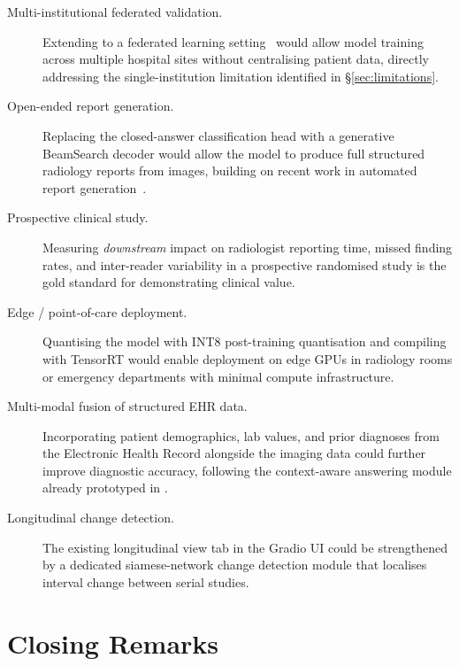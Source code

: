 \begin{description}
  \item[Multi-institutional federated validation.]
        Extending \medxplain{} to a federated learning setting~\citep{mcmahan2017federated}
        would allow model training across multiple hospital sites without
        centralising patient data, directly addressing the single-institution
        limitation identified in \S\ref{sec:limitations}.

  \item[Open-ended report generation.]
        Replacing the closed-answer classification head with a generative
        BeamSearch decoder would allow the model to produce full structured
        radiology reports from images, building on recent work in automated
        report generation~\citep{tanida2023rgrg}.

  \item[Prospective clinical study.]
        Measuring \emph{downstream} impact on radiologist reporting time,
        missed finding rates, and inter-reader variability in a prospective
        randomised study is the gold standard for demonstrating clinical value.

  \item[Edge / point-of-care deployment.]
        Quantising the model with INT8 post-training quantisation and
        compiling with TensorRT would enable deployment on edge GPUs in
        radiology rooms or emergency departments with minimal compute
        infrastructure.

  \item[Multi-modal fusion of structured EHR data.]
        Incorporating patient demographics, lab values, and prior diagnoses
        from the Electronic Health Record alongside the imaging data could
        further improve diagnostic accuracy, following the context-aware
        answering module already prototyped in
        .

  \item[Longitudinal change detection.]
        The existing longitudinal view tab in the Gradio UI could be
        strengthened by a dedicated siamese-network change detection module
        that localises interval change between serial studies.
\end{description}

\section{Closing Remarks}
\label{sec:closing}

